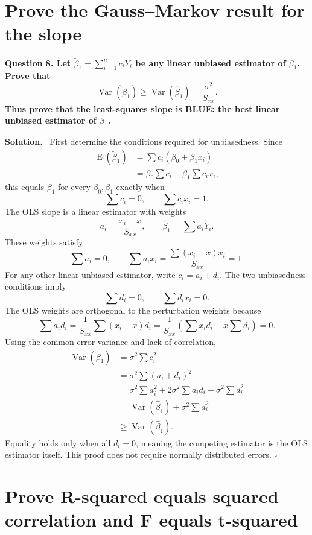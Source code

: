 \documentclass[11pt]{article}
\newcommand{\Sxx}{S_{xx}}
\newcommand{\bone}{\widehat{\beta}_1}
\newcommand{\Var}{\operatorname{Var}}
\newcommand{\E}{\operatorname{E}}
\newenvironment{question}
  {\par\medskip\noindent\color{navy}\bfseries}
  {\par\medskip\color{black}}
\newenvironment{solution}
  {\noindent\color{darkgreen}\textbf{Solution.}\color{black}\ }
  {\hfill$\square$\par\medskip}
\begin{document}
\section{Prove the Gauss--Markov result for the slope}

\begin{question}
Question 8. Let $\widetilde\beta_1=\sum_{i=1}^n c_iY_i$ be any linear
unbiased estimator of $\beta_1$. Prove that
\[
  \Var(\widetilde\beta_1)\geq \Var(\bone)
  =\frac{\sigma^2}{\Sxx}.
\]
Thus prove that the least-squares slope is BLUE: the best linear unbiased
estimator of $\beta_1$.
\end{question}

\begin{solution}
First determine the conditions required for unbiasedness. Since
\begin{align*}
\E(\widetilde\beta_1)
 &=\sum c_i(\beta_0+\beta_1x_i)\\
 &=\beta_0\sum c_i+\beta_1\sum c_ix_i,
\end{align*}
this equals $\beta_1$ for every $\beta_0,\beta_1$ exactly when
\[
 \sum c_i=0,
 \qquad
 \sum c_ix_i=1.
\]
The OLS slope is a linear estimator with weights
\[
 a_i=\frac{x_i-\bar x}{\Sxx},
 \qquad
 \bone=\sum a_iY_i.
\]
These weights satisfy
\[
 \sum a_i=0,
 \qquad
 \sum a_ix_i
 =\frac{\sum(x_i-\bar x)x_i}{\Sxx}=1.
\]
For any other linear unbiased estimator, write $c_i=a_i+d_i$. The two
unbiasedness conditions imply
\[
 \sum d_i=0,
 \qquad
 \sum d_ix_i=0.
\]
The OLS weights are orthogonal to the perturbation weights because
\[
 \sum a_id_i
 =\frac1{\Sxx}\sum(x_i-\bar x)d_i
 =\frac1{\Sxx}\left(\sum x_id_i-\bar x\sum d_i\right)
 =0.
\]
Using the common error variance and lack of correlation,
\begin{align*}
\Var(\widetilde\beta_1)
 &=\sigma^2\sum c_i^2\\
 &=\sigma^2\sum(a_i+d_i)^2\\
 &=\sigma^2\sum a_i^2
   +2\sigma^2\sum a_id_i
   +\sigma^2\sum d_i^2\\
 &=\Var(\bone)+\sigma^2\sum d_i^2\\
 &\geq\Var(\bone).
\end{align*}
Equality holds only when all $d_i=0$, meaning the competing estimator is the
OLS estimator itself. This proof does not require normally distributed errors.
\end{solution}

\section{Prove R-squared equals squared correlation and F equals t-squared}
\end{document}
